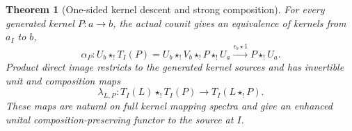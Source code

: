 \documentclass[11pt]{article}
\newtheorem{theorem}[proposition]{Theorem}
\theoremstyle{definition}
\theoremstyle{remark}
\begin{document}
\begin{theorem}[One-sided kernel descent and strong composition]
\label{thm:one-sided-descent}
For every generated kernel $P:a\to b$, the actual counit gives an
equivalence of kernels from $a_I$ to $b$,
\begin{equation}
 \alpha_P:
 U_b\star_!T_I(P)
   =U_b\star_!V_b\star_!P\star_!U_a
   \xrightarrow{\epsilon_b\star 1}P\star_!U_a.
 \label{eq:one-sided-descent}
\end{equation}
Product direct image restricts to the generated kernel sources and
has invertible unit and composition maps
\begin{equation}
 \lambda_{L,P}:T_I(L)\star_!T_I(P)
          \longrightarrow T_I(L\star_!P).
 \label{eq:product-convolution}
\end{equation}
These maps are natural on full kernel mapping spectra and give an
enhanced unital composition-preserving functor to the source at $I$.
\end{theorem}
\end{document}
